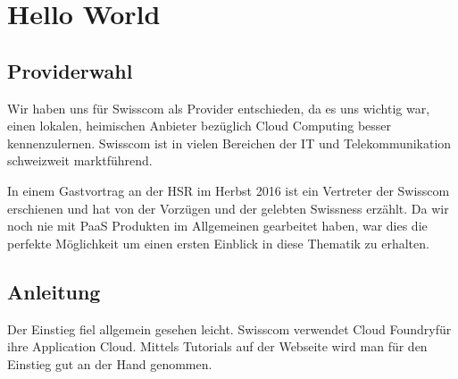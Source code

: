 \chapter{Hello World}
\section{Providerwahl}
Wir haben uns für Swisscom als Provider entschieden, da es uns wichtig war, einen lokalen, heimischen Anbieter bezüglich Cloud Computing besser kennenzulernen. Swisscom ist in vielen Bereichen der IT und Telekommunikation schweizweit marktführend. 

In einem Gastvortrag an der HSR im Herbst 2016 ist ein Vertreter der Swisscom erschienen und hat von der Vorzügen und der gelebten Swissness erzählt. Da wir noch nie mit PaaS Produkten im Allgemeinen gearbeitet haben, war dies die perfekte Möglichkeit um einen ersten Einblick in diese Thematik zu erhalten.
\section{Anleitung}
Der Einstieg fiel allgemein gesehen leicht. Swisscom verwendet \glqq Cloud Foundry\grqq für ihre Application Cloud. Mittels Tutorials auf der Webseite wird man für den Einstieg gut \glqq an der Hand genommen\grqq .

